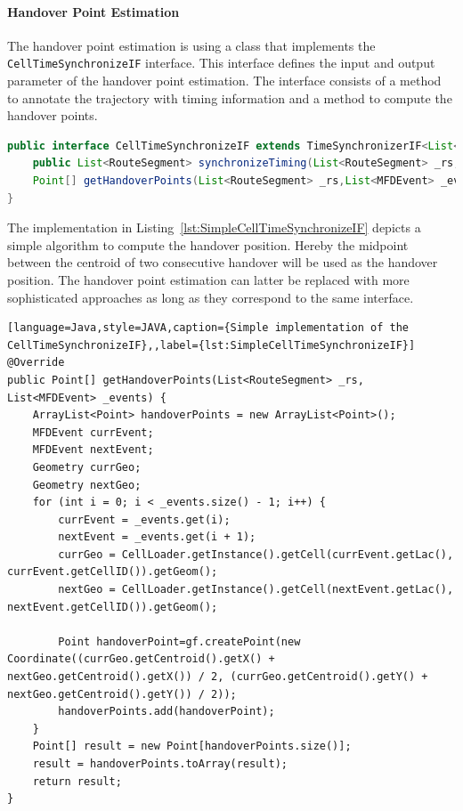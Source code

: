 \paragraph{Handover Point Estimation}
The handover point estimation is using a class that implements the \lstinline|CellTimeSynchronizeIF| interface. This interface defines the input and output parameter of the handover point estimation. The interface consists of a method to annotate the trajectory with timing information and a method to compute the handover points. 
\begin{lstlisting}[language=Java,style=JAVA,caption={Interface for handover point estimation CellTimeSynchronizeIF},label={lst:CellTimeSynchronizeIF}]
public interface CellTimeSynchronizeIF extends TimeSynchronizerIF<List<MFDEvent>> {
    public List<RouteSegment> synchronizeTiming(List<RouteSegment> _rs,List<MFDEvent> _events);
    Point[] getHandoverPoints(List<RouteSegment> _rs,List<MFDEvent> _events);
}
\end{lstlisting}
The implementation in Listing~\ref{lst:SimpleCellTimeSynchronizeIF} depicts a simple algorithm to compute the handover position. Hereby the midpoint between the centroid of two consecutive handover will be used as the handover position. The handover point estimation can latter be replaced with more sophisticated approaches as long as they correspond to the same interface.
\begin{lstlisting}[language=Java,style=JAVA,caption={Simple implementation of the CellTimeSynchronizeIF},,label={lst:SimpleCellTimeSynchronizeIF}]
@Override
public Point[] getHandoverPoints(List<RouteSegment> _rs, List<MFDEvent> _events) {
	ArrayList<Point> handoverPoints = new ArrayList<Point>();
	MFDEvent currEvent;
	MFDEvent nextEvent;
	Geometry currGeo;
	Geometry nextGeo;
	for (int i = 0; i < _events.size() - 1; i++) {
		currEvent = _events.get(i);
		nextEvent = _events.get(i + 1);
		currGeo = CellLoader.getInstance().getCell(currEvent.getLac(), currEvent.getCellID()).getGeom();
		nextGeo = CellLoader.getInstance().getCell(nextEvent.getLac(), nextEvent.getCellID()).getGeom();
	
		Point handoverPoint=gf.createPoint(new Coordinate((currGeo.getCentroid().getX() + nextGeo.getCentroid().getX()) / 2, (currGeo.getCentroid().getY() + nextGeo.getCentroid().getY()) / 2));
		handoverPoints.add(handoverPoint);
	}
	Point[] result = new Point[handoverPoints.size()];
	result = handoverPoints.toArray(result);
	return result;
}

\end{lstlisting}

